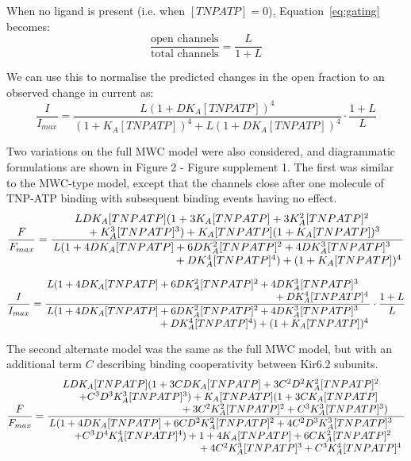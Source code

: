 \documentclass[10pt,lineno, doublespacing]{elife}
\begin{document}
When no ligand is present (i.e. when $[TNPATP] = 0$), Equation~\ref{eq:gating} becomes:
\begin{equation} \label{eq:intrinsic_po}
\frac{\text{open channels}}{\text{total channels}} = \frac
    {L}
    {1+L}
\end{equation}

We can use this to normalise the predicted changes in the open fraction to an observed change in current as:
\begin{equation} \label{eq:normalised_po}
\frac{I}{I_{max}} = \frac
    {L(1+DK_A[TNPATP])^4}
    {(1+K_A[TNPATP])^4+L(1+DK_A[TNPATP])^4}\cdot
   \frac
    {1+L}
    {L}
\end{equation}

Two variations on the full MWC model were also considered, and diagrammatic formulations are shown in Figure 2 - Figure supplement 1.
The first was similar to the MWC-type model, except that the channels close after one molecule of TNP-ATP binding with subsequent binding events having no effect.
\begin{equation} \label{eq:binding_2}
\frac{F}{F_{max}} = \frac{\splitfrac
    {LDK_A[TNPATP](1+3K_A[TNPATP]+3K_A^2[TNPATP]^2}
    {+K_A^3[TNPATP]^3)+K_A[TNPATP](1+K_A[TNPATP])^3}}{\splitfrac
    {L(1+4DK_A[TNPATP]+6DK_A^2[TNPATP]^2+4DK_A^3[TNPATP]^3}
    {+DK_A^4[TNPATP]^4)+(1+K_A[TNPATP])^4}}
\end{equation}

\begin{equation} \label{eq:gating_2}
\frac{I}{I_{max}} = \frac{\splitfrac
    {L(1+4DK_A[TNPATP]+6DK_A^2[TNPATP]^2+4DK_A^3[TNPATP]^3}
    {+DK_A^4[TNPATP]^4}}{\splitfrac
    {L(1+4DK_A[TNPATP]+6DK_A^2[TNPATP]^2+4DK_A^3[TNPATP]^3}
    {+DK_A^4[TNPATP]^4)+(1+K_A[TNPATP])^4}}\cdot
   \frac
    {1+L}
    {L}
\end{equation}

The second alternate model was the same as the full MWC model, but with an additional term $C$ describing binding cooperativity between Kir6.2 subunits.
\begin{equation} \label{eq:binding_3}
\frac{F}{F_{max}} = \frac{\splitfrac
    {LDK_A[TNPATP](1+3CDK_A[TNPATP]+3C^2D^2K_A^2[TNPATP]^2}{\splitfrac
    {+C^3D^3K_A^3[TNPATP]^3)+K_A[TNPATP](1+3CK_A[TNPATP]}
    {+3C^2K_A^2[TNPATP]^2+C^3K_A^3[TNPATP]^3)}}}{\splitfrac
    {L(1+4DK_A[TNPATP]+6CD^2K_A^2[TNPATP]^2+4C^2D^3K_A^3[TNPATP]^3}{\splitfrac
    {+C^3D^4K_A^4[TNPATP]^4)+1+4K_A[TNPATP]+6CK_A^2[TNPATP]^2}
    {+4C^2K_A^3[TNPATP]^3+C^3K_A^4[TNPATP]^4}}}
\end{equation}
\end{document}
